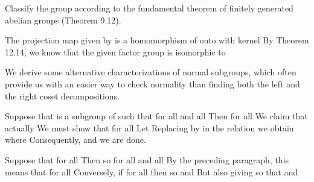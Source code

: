 \documentclass[11pt,oneside]{article}
\begin{document}
\begin{BookBody}

 Classify the group  according to the fundamental theorem of finitely generated abelian groups (Theorem 9.12).

 The projection map  given by  is a homomorphism of  onto  with kernel  By Theorem 12.14, we know that the given factor group is isomorphic to \BookEnd{\blacktriangle}


\noindent We derive some alternative characterizations of normal subgroups, which often provide us with an easier way to check normality than finding both the left and the right coset decompositions.

Suppose that  is a subgroup of  such that  for all  and all  Then  for all  We claim that actually  We must show that  for all  Let  Replacing  by  in the relation  we obtain  where  Consequently,  and we are done.

Suppose that  for all  Then  so  for all  and all  By the preceding paragraph, this means that  for all  Conversely, if  for all  then  so  and  But also giving  so that  and  


\end{BookBody}
\end{document}
